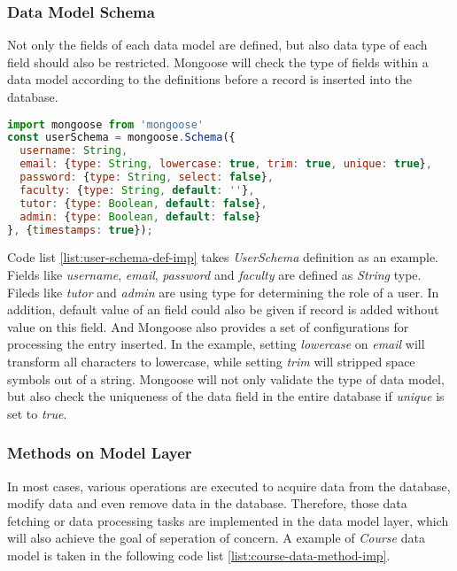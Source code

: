 \subsubsection{Data Model Schema}

Not only the fields of each data model are defined, but also data type of each field should also be restricted. Mongoose will check the type of fields within a data model according to the definitions before a record is inserted into the database. 

\begin{lstlisting}[language=JavaScript, caption=Example: user schema definition within Mongoose, label={list:user-schema-def-imp}]
import mongoose from 'mongoose'
const userSchema = mongoose.Schema({
  username: String,
  email: {type: String, lowercase: true, trim: true, unique: true},
  password: {type: String, select: false},
  faculty: {type: String, default: ''},
  tutor: {type: Boolean, default: false},
  admin: {type: Boolean, default: false}
}, {timestamps: true});
\end{lstlisting}

Code list \ref{list:user-schema-def-imp} takes \textit{UserSchema} definition as an example. Fields like \textit{username}, \textit{email}, \textit{password} and \textit{faculty} are defined as \textit{String} type. Fileds like \textit{tutor} and \textit{admin} are using  type for determining the role of a user. In addition, default value of an field could also be given if record is added without value on this field. And Mongoose also provides a set of configurations for processing the entry inserted. In the example, setting \textit{lowercase} on \textit{email} will transform all characters to lowercase, while setting \textit{trim} will stripped space symbols out of a string. Mongoose will not only validate the type of data model, but also check the uniqueness of the data field in the entire database if \textit{unique} is set to \textit{true}. 

\subsubsection{Methods on Model Layer}
In most cases, various operations are executed to acquire data from the database, modify data and even remove data in the database. Therefore, those data fetching or data processing tasks are implemented in the data model layer, which will also achieve the goal of seperation of concern. A example of \textit{Course} data model is taken in the following code list \ref{list:course-data-method-imp}.

